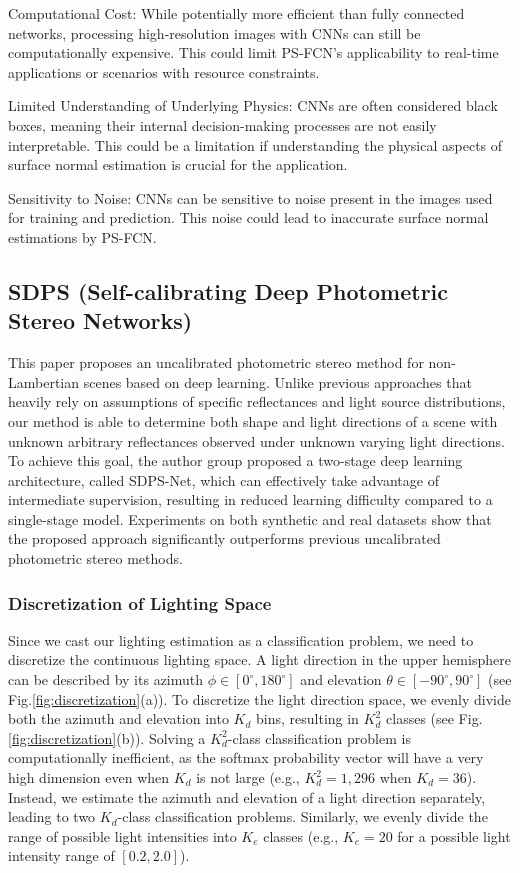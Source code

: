 Computational Cost: While potentially more efficient than fully connected networks, processing high-resolution images with CNNs can still be computationally expensive. This could limit PS-FCN's applicability to real-time applications or scenarios with resource constraints.

Limited Understanding of Underlying Physics:  CNNs are often considered black boxes, meaning their internal decision-making processes are not easily interpretable. This could be a limitation if understanding the physical aspects of surface normal estimation is crucial for the application.

Sensitivity to Noise: CNNs can be sensitive to noise present in the images used for training and prediction. This noise could lead to inaccurate surface normal estimations by PS-FCN.

\subsection{SDPS (Self-calibrating Deep Photometric Stereo Networks)}

This paper proposes an uncalibrated photometric stereo method for non-Lambertian scenes based on deep learning\cite{sdps}. Unlike previous approaches that heavily rely on assumptions of specific reflectances and light source distributions, our method is able to determine both shape and light directions of a scene with unknown arbitrary reflectances observed under unknown varying light directions. To achieve this goal, the author group proposed a two-stage deep learning architecture, called SDPS-Net, which can effectively take advantage of intermediate supervision, resulting in reduced learning difficulty compared to a single-stage model. Experiments on both synthetic and real datasets show that the proposed approach significantly outperforms previous uncalibrated photometric stereo methods.


\subsubsection{Discretization of Lighting Space}

Since we cast our lighting estimation as a classification problem, we need to discretize the continuous lighting space. A light direction in the upper hemisphere can be described by its azimuth $\phi \in [0^\circ, 180^\circ]$ and elevation $\theta \in [-90^\circ, 90^\circ]$ (see Fig.\ref{fig:discretization}(a)). To discretize the light direction space, we evenly divide both the azimuth and elevation into $K_d$ bins, resulting in $K_d^2$ classes (see Fig.\ref{fig:discretization}(b)). Solving a $K_d^2$-class classification problem is computationally inefficient, as the softmax probability vector will have a very high dimension even when $K_d$ is not large (e.g., $K_d^2 = 1,296$ when $K_d = 36$). Instead, we estimate the azimuth and elevation of a light direction separately, leading to two $K_d$-class classification problems. Similarly, we evenly divide the range of possible light intensities into $K_e$ classes (e.g., $K_e = 20$ for a possible light intensity range of $[0.2, 2.0]$).

